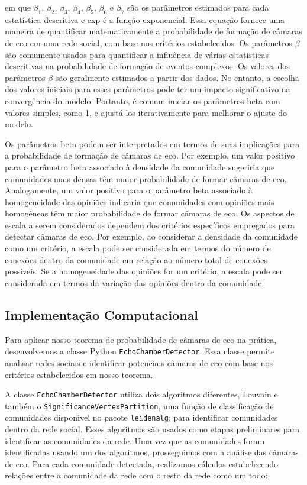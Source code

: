 em que $\beta_1$, $\beta_2$, $\beta_3$, $\beta_4$, $\beta_5$, $\beta_6$ e $\beta_7$ são os parâmetros estimados para cada estatística descritiva e exp é a função exponencial. Essa equação fornece uma maneira de quantificar matematicamente a probabilidade de formação de câmaras de eco em uma rede social, com base nos critérios estabelecidos. Os parâmetros $\beta$ são comumente usados para quantificar a influência de várias estatísticas descritivas na probabilidade de formação de eventos complexos. Os valores dos parâmetros $\beta$ são geralmente estimados a partir dos dados. No entanto, a escolha dos valores iniciais para esses parâmetros pode ter um impacto significativo na convergência do modelo. Portanto, é comum iniciar os parâmetros beta com valores simples, como 1, e ajustá-los iterativamente para melhorar o ajuste do modelo.

Os parâmetros beta podem ser interpretados em termos de suas implicações para a probabilidade de formação de câmaras de eco. Por exemplo, um valor positivo para o parâmetro beta associado à densidade da comunidade sugeriria que comunidades mais densas têm maior probabilidade de formar câmaras de eco. Analogamente, um valor positivo para o parâmetro beta associado à homogeneidade das opiniões indicaria que comunidades com opiniões mais homogêneas têm maior probabilidade de formar câmaras de eco. Os aspectos de escala a serem considerados dependem dos critérios específicos empregados para detectar câmaras de eco. Por exemplo, ao considerar a densidade da comunidade como um critério, a escala pode ser considerada em termos do número de conexões dentro da comunidade em relação ao número total de conexões possíveis. Se a homogeneidade das opiniões for um critério, a escala pode ser considerada em termos da variação das opiniões dentro da comunidade.

\subsection{Implementação Computacional}

Para aplicar nosso teorema de probabilidade de câmaras de eco na prática, desenvolvemos a classe Python \texttt{EchoChamberDetector}. Essa classe permite analisar redes sociais e identificar potenciais câmaras de eco com base nos critérios estabelecidos em nosso teorema.

A classe \texttt{EchoChamberDetector} utiliza dois algoritmos diferentes, Louvain e também o \texttt{SignificanceVertexPartition}, uma função de classificação de comunidades disponivel no pacote \texttt{leidenalg}; para identificar comunidades dentro da rede social. Esses algoritmos são usados como etapas preliminares para identificar as comunidades da rede. Uma vez que as comunidades foram identificadas usando um dos algoritmos, prosseguimos com a análise das câmaras de eco. Para cada comunidade detectada, realizamos cálculos estabelecendo relações entre a comunidade da rede com o resto da rede como um todo:

